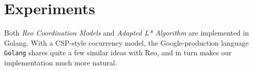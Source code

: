 \documentclass[conference, a4paper]{IEEEtran}
\newtheorem{definition}{Definition}
\begin{document}








\section{Experiments} 
\label{sec:experiment}

Both \emph{Reo Coordination Models} and \emph{Adapted L* Algorithm} are implemented in
Golang. With a CSP-style\cite{DBLP:books/ph/Hoare85} cocurrency model, the Google-production language
\texttt{Golang} shares quite a few similar ideas with Reo, and in turn makes our implementation much
more natural.
\end{document}
